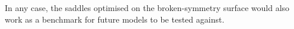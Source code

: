 In any case, the saddles optimised on the broken-symmetry surface would
also work as a benchmark for future models to be tested against.

